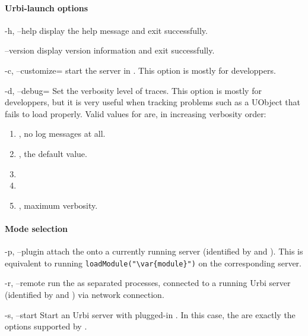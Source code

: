 \paragraph{Urbi-launch options}
\begin{options}
\item[-h, --help] display the help message and exit successfully.
\item[--version] display version information and exit successfully.
\item[-c, --customize=\var{file}] start the \urbi server in
  .  This option is mostly for developpers.
\item[-d, --debug=\var{level}] Set the verbosity level of traces.
  This option is mostly for developpers, but it is very useful when
  tracking problems such as a UObject that fails to load properly.
  Valid values for  are, in increasing verbosity order:
  \begin{enumerate}
  \item {}, no log messages at all.
  \item {}, the default value.
  \item {}
  \item {}
  \item {}, maximum verbosity.
  \end{enumerate}
\end{options}

\paragraph{Mode selection}
\begin{options}
\item[-p, --plugin] attach the  onto a currently running
  \urbi server (identified by  and ).  This is
  equivalent to running \lstinline|loadModule("\var{module}")| on the
  corresponding server.

\item[-r, --remote] run the  as separated processes,
  connected to a running Urbi server (identified by  and
  ) via network connection.

\item[-s, --start] Start an Urbi server with plugged-in
  .  In this case, the  are exactly
  the options supported by .
\end{options}

